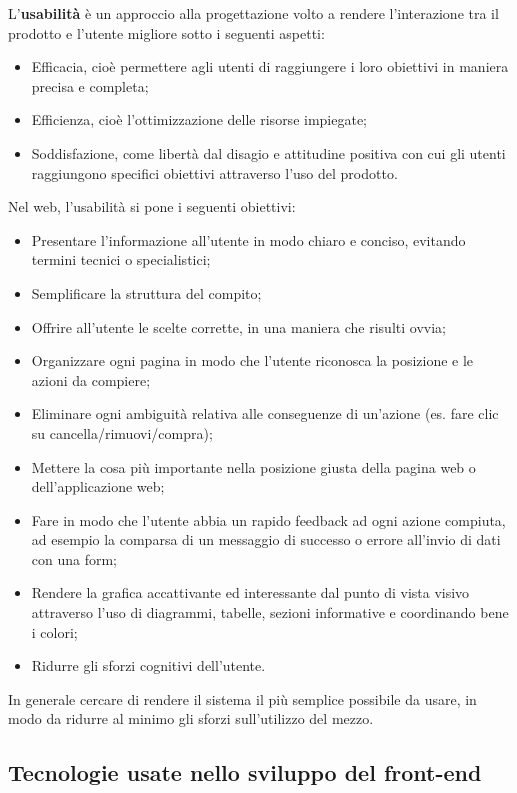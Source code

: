 L'\textbf{usabilità} è un approccio alla progettazione volto a rendere l'interazione tra il prodotto e l'utente migliore sotto i seguenti aspetti:
\begin{itemize}
    \item Efficacia, cioè permettere agli utenti di raggiungere i loro obiettivi in maniera precisa e completa;
    \item Efficienza, cioè l'ottimizzazione delle risorse impiegate;
    \item Soddisfazione, come libertà dal disagio e attitudine positiva con cui gli utenti raggiungono specifici obiettivi attraverso l’uso del prodotto.
\end{itemize}
Nel web, l'usabilità si pone i seguenti obiettivi:
\begin{itemize}
    \item Presentare l'informazione all'utente in modo chiaro e conciso, evitando termini tecnici o specialistici;
    \item Semplificare la struttura del compito;
    \item Offrire all'utente le scelte corrette, in una maniera che risulti ovvia;
    \item Organizzare ogni pagina in modo che l'utente riconosca la posizione e le azioni da compiere;
    \item Eliminare ogni ambiguità relativa alle conseguenze di un'azione (es. fare clic su cancella/rimuovi/compra);
    \item Mettere la cosa più importante nella posizione giusta della pagina web o dell'applicazione web;
    \item Fare in modo che l'utente abbia un rapido feedback ad ogni azione compiuta, ad esempio la comparsa di un messaggio di successo o errore all'invio di dati con una form;
    \item Rendere la grafica accattivante ed interessante dal punto di vista visivo attraverso l'uso di diagrammi, tabelle, sezioni informative e coordinando bene i colori;
    \item Ridurre gli sforzi cognitivi dell'utente.
\end{itemize}
In generale cercare di rendere il sistema il più semplice possibile da usare, in modo da ridurre al minimo gli sforzi sull'utilizzo del mezzo.


\subsection{Tecnologie usate nello sviluppo del front-end}

